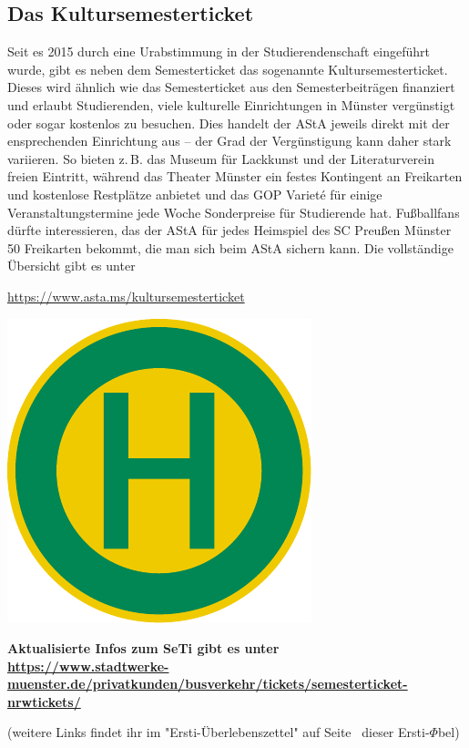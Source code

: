 \begin{multicols*}{2}
\subsection{Das Kultursemesterticket}
Seit es 2015 durch eine Urabstimmung in der Studierendenschaft eingeführt wurde, gibt es neben dem Semesterticket das sogenannte Kultursemesterticket. Dieses wird ähnlich wie das Semesterticket aus den Semesterbeiträgen finanziert und erlaubt Studierenden, viele kulturelle Einrichtungen in Münster vergünstigt oder sogar kostenlos zu besuchen. Dies handelt der AStA jeweils direkt mit der ensprechenden Einrichtung aus – der Grad der Vergünstigung kann daher stark variieren. So bieten z.\,B. das Museum für Lackkunst und der Literaturverein freien Eintritt, während das Theater Münster ein festes Kontingent an Freikarten und kostenlose Restplätze anbietet und das GOP Variet\'e für einige Veranstaltungstermine jede Woche Sonderpreise für Studierende hat. Fußballfans dürfte interessieren, das der AStA für jedes Heimspiel des SC Preußen Münster 50 Freikarten bekommt, die man sich beim AStA sichern kann.
Die vollständige Übersicht gibt es unter
\vspace{-1ex}
\begin{center}
	\url{https://www.asta.ms/kultursemesterticket}
\end{center}

\smallskip

\begin{center}
	\includegraphics[width=\columnwidth, height=0.14\textheight]{res/bushaltestelle.pdf}

	{\bfseries
	Aktualisierte Infos zum SeTi gibt es unter\\
	\url{https://www.stadtwerke-muenster.de/privatkunden/busverkehr/tickets/semesterticket-nrwtickets/}}
	
	(weitere Links findet ihr im "Ersti-Überlebenszettel" auf Seite~\pageref{dpü} dieser Ersti-$\Phi$bel)
\end{center}

\end{multicols*}

